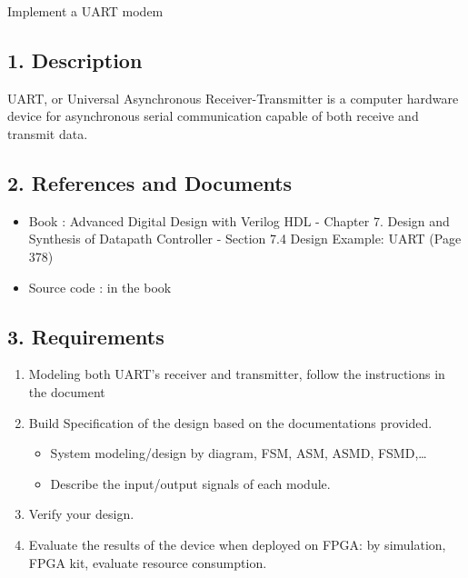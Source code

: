 \documentclass{vhdl-assignment}
\begin{document}
\pagebreak
\begin{project}{Implement a UART modem}
    \subsection*{1. Description}
    UART, or Universal Asynchronous Receiver-Transmitter is a computer hardware device for asynchronous serial communication capable of both receive and transmit data.
    \subsection*{2. References and Documents}
    \begin{itemize}
        \item Book : Advanced Digital Design with Verilog HDL - Chapter 7. Design and Synthesis of Datapath Controller - Section 7.4 Design Example: UART (Page 378)
        \item Source code : in the book
    \end{itemize}
    \subsection*{3. Requirements}
    \begin{enumerate}
        \item Modeling both UART's receiver and transmitter, follow the instructions in the document
        \item Build Specification of the design based on the documentations provided.
        \begin{itemize}
            \item System modeling/design by diagram, FSM, ASM, ASMD, FSMD,\dots
            \item Describe the input/output signals of each module.
        \end{itemize}
        \item Verify your design.
        \item Evaluate the results of the device when deployed on FPGA: by simulation, FPGA kit, evaluate resource consumption.
    \end{enumerate}
\end{project}
\end{document}
